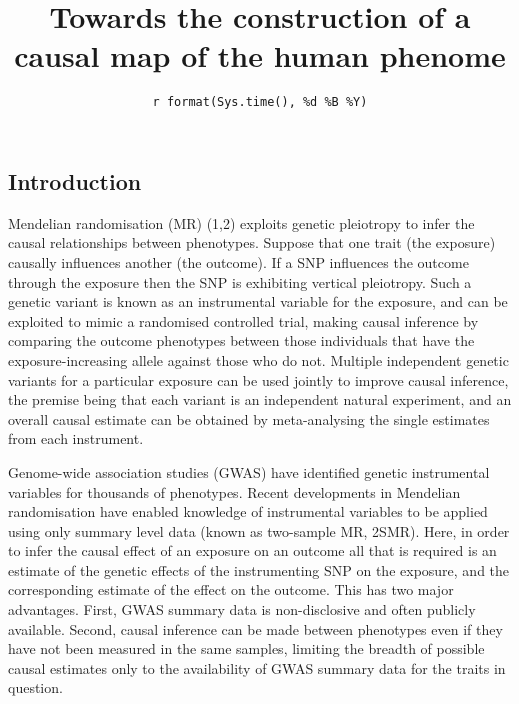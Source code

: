 \documentclass[]{article}
\title{Towards the construction of a causal map of the human phenome}
\author{}
\date{\texttt{r\ format(Sys.time(),\ \textquotesingle{}\%d\ \%B\ \%Y\textquotesingle{})}}
\begin{document}
\maketitle

\subsection{Introduction}\label{introduction}

Mendelian randomisation (MR) (1,2) exploits genetic pleiotropy to infer
the causal relationships between phenotypes. Suppose that one trait (the
exposure) causally influences another (the outcome). If a SNP influences
the outcome through the exposure then the SNP is exhibiting vertical
pleiotropy. Such a genetic variant is known as an instrumental variable
for the exposure, and can be exploited to mimic a randomised controlled
trial, making causal inference by comparing the outcome phenotypes
between those individuals that have the exposure-increasing allele
against those who do not. Multiple independent genetic variants for a
particular exposure can be used jointly to improve causal inference, the
premise being that each variant is an independent natural experiment,
and an overall causal estimate can be obtained by meta-analysing the
single estimates from each instrument.

Genome-wide association studies (GWAS) have identified genetic
instrumental variables for thousands of phenotypes. Recent developments
in Mendelian randomisation have enabled knowledge of instrumental
variables to be applied using only summary level data (known as
two-sample MR, 2SMR). Here, in order to infer the causal effect of an
exposure on an outcome all that is required is an estimate of the
genetic effects of the instrumenting SNP on the exposure, and the
corresponding estimate of the effect on the outcome. This has two major
advantages. First, GWAS summary data is non-disclosive and often
publicly available. Second, causal inference can be made between
phenotypes even if they have not been measured in the same samples,
limiting the breadth of possible causal estimates only to the
availability of GWAS summary data for the traits in question.
\end{document}
